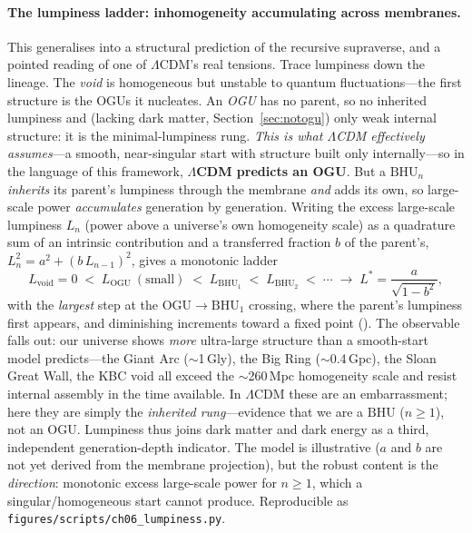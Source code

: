 \paragraph{The lumpiness ladder: inhomogeneity accumulating across membranes.} This
generalises into a structural prediction of the recursive supraverse, and a pointed
reading of one of $\Lambda$CDM's real tensions. Trace lumpiness down the lineage. The
\emph{void} is homogeneous but unstable to quantum fluctuations---the first structure
is the OGUs it nucleates. An \emph{OGU} has no parent, so no inherited lumpiness and
(lacking dark matter, Section~\ref{sec:notogu}) only weak internal structure: it is the
minimal-lumpiness rung. \emph{This is what $\Lambda$CDM effectively assumes}---a
smooth, near-singular start with structure built only internally---so in the language
of this framework, \textbf{$\Lambda$CDM predicts an OGU}. But a $\mathrm{BHU}_n$
\emph{inherits} its parent's lumpiness through the membrane \emph{and} adds its own, so
large-scale power \emph{accumulates} generation by generation. Writing the excess
large-scale lumpiness $L_n$ (power above a universe's own homogeneity scale) as a
quadrature sum of an intrinsic contribution and a transferred fraction $b$ of the
parent's, $L_n^2 = a^2 + (b\,L_{n-1})^2$, gives a monotonic ladder
\[
  L_{\mathrm{void}}=0 \;<\; L_{\mathrm{OGU}}\ (\text{small}) \;<\; L_{\mathrm{BHU}_1}
  \;<\; L_{\mathrm{BHU}_2} \;<\; \cdots \;\to\; L^* = \frac{a}{\sqrt{1-b^2}},
\]
with the \emph{largest} step at the $\mathrm{OGU}\!\to\!\mathrm{BHU}_1$ crossing, where
the parent's lumpiness first appears, and diminishing increments toward a fixed point
(). The observable falls out: our universe shows \emph{more}
ultra-large structure than a smooth-start model predicts---the Giant Arc
($\sim$1\,Gly), the Big Ring ($\sim$0.4\,Gpc), the Sloan Great Wall, the KBC void all
exceed the $\sim$260\,Mpc homogeneity scale and resist internal assembly in the time
available. In $\Lambda$CDM these are an embarrassment; here they are simply the
\emph{inherited rung}---evidence that we are a $\mathrm{BHU}$ ($n\ge1$), not an OGU.
Lumpiness thus joins dark matter and dark energy as a third, independent
generation-depth indicator. The model is illustrative ($a$ and $b$ are not yet derived
from the membrane projection), but the robust content is the \emph{direction}:
monotonic excess large-scale power for $n\ge1$, which a singular/homogeneous start
cannot produce. Reproducible as \texttt{figures/scripts/ch06\_lumpiness.py}.

